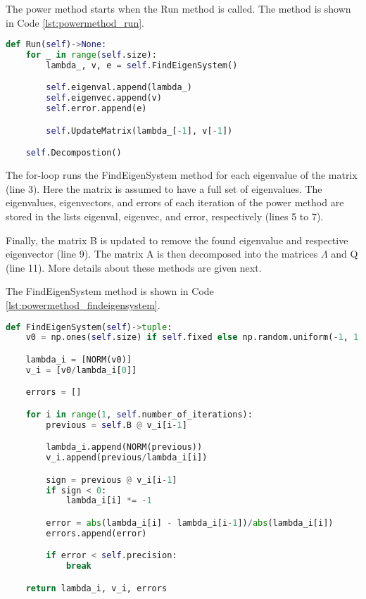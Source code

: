 The power method starts when the Run method is called. The method is shown in Code \ref{lst:powermethod_run}.
\begin{lstlisting}[caption={PowerMethod Run method}, label={lst:powermethod_run}, language=python]
def Run(self)->None:
    for _ in range(self.size):
        lambda_, v, e = self.FindEigenSystem()

        self.eigenval.append(lambda_)
        self.eigenvec.append(v)
        self.error.append(e)

        self.UpdateMatrix(lambda_[-1], v[-1])

    self.Decompostion()
\end{lstlisting}

The for-loop runs the FindEigenSystem method for each eigenvalue of the matrix (line 3). Here the matrix is assumed to have a full set of eigenvalues. The eigenvalues, eigenvectors, and errors of each iteration of the power method are stored in the lists eigenval, eigenvec, and error, respectively (lines 5 to 7). 

Finally, the matrix B is updated to remove the found eigenvalue and respective eigenvector (line 9). The matrix A is then decomposed into the matrices $\Lambda$ and Q (line 11). More details about these methods are given next.

The FindEigenSystem method is shown in Code \ref{lst:powermethod_findeigensystem}.
\begin{lstlisting}[caption={PowerMethod FindEigenSystem method}, label={lst:powermethod_findeigensystem}, language=python]
def FindEigenSystem(self)->tuple:
    v0 = np.ones(self.size) if self.fixed else np.random.uniform(-1, 1, self.size)

    lambda_i = [NORM(v0)]
    v_i = [v0/lambda_i[0]]

    errors = []

    for i in range(1, self.number_of_iterations):
        previous = self.B @ v_i[i-1]

        lambda_i.append(NORM(previous))
        v_i.append(previous/lambda_i[i])

        sign = previous @ v_i[i-1]
        if sign < 0:
            lambda_i[i] *= -1

        error = abs(lambda_i[i] - lambda_i[i-1])/abs(lambda_i[i])
        errors.append(error)

        if error < self.precision:
            break

    return lambda_i, v_i, errors
\end{lstlisting}

